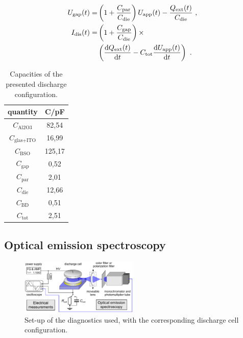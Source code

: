 \documentclass[a4paper,10pt,twoside]{article}
\newcommand{\diff}{\textnormal{d}}
\newcommand{\ix}[1]{_\text{#1}}
\begin{document}
				\begin{align}
					 U\ix{gap}(t)=&\left(1+\frac{C\ix{par}}{C\ix{die}}\right)U\ix{app}(t)-\frac{Q\ix{ext}(t)}{C\ix{die}} \,\, , \\
					 I\ix{dis}(t)=&\left(1+\frac{C\ix{gap}}{C\ix{die}}\right)\times \nonumber \\
					 &\left(\frac{\diff Q\ix{ext}(t)}{\diff t}-C\ix{tot}\frac{\diff U\ix{app}(t)}{\diff t}\right) \,\, .
				\end{align}	

				\begin{table}
					\centering
					\begin{tabular}{c|c}
						quantity & C/pF \\ \hline\hline
						$C\ix{Al2O3}$ &  82,54 \\ \hline
						$C\ix{glas+ITO}$ & 16,99 \\ \hline
						$C\ix{BSO}$ & 125,17 \\ \hline
						$C\ix{gap}$ & 0,52 \\ \hline
						$C\ix{par}$ & 2,01 \\ \hline
						$C\ix{die}$ & 12,66 \\ \hline
						$C\ix{BD}$ & 0,51 \\ \hline
						$C\ix{tot}$ & 2,51 \\
					\end{tabular}
					\caption{Capacities of the presented discharge configuration.}\label{tab:capac}
				\end{table}
	
		\subsection{Optical emission spectroscopy}\label{subsec:oes}
		
				\begin{figure}
					\centering
					\includegraphics[width=0.5\textwidth]{figures/setup/setup.pdf}
					\caption{Set-up of the diagnostics used, with the corresponding discharge cell configuration.}
					\label{img:diag}
				\end{figure}
		
\end{document}
